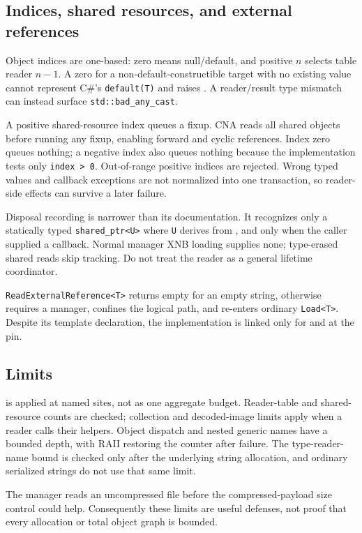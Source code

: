\subsection{Indices, shared resources, and external references}

Object indices are one-based: zero means null/default, and positive $n$ selects table reader
$n-1$. A zero for a non-default-constructible target with no existing value cannot represent
C\#'s \texttt{default(T)} and raises . A reader/result type
mismatch can instead surface \texttt{std::bad\_any\_cast}.

A positive shared-resource index queues a fixup. CNA reads all shared objects before running any
fixup, enabling forward and cyclic references. Index zero queues nothing; a negative index also
queues nothing because the implementation tests only \texttt{index > 0}. Out-of-range positive
indices are rejected. Wrong typed values and callback exceptions are not normalized into one
transaction, so reader-side effects can survive a later failure.

Disposal recording is narrower than its documentation. It recognizes only a statically typed
\texttt{shared\_ptr<U>} where \texttt{U} derives from , and only when the
caller supplied a callback. Normal manager XNB loading supplies none; type-erased shared reads
skip tracking. Do not treat the reader as a general lifetime coordinator.

\texttt{ReadExternalReference<T>} returns empty for an empty string, otherwise requires a manager,
confines the logical path, and re-enters ordinary \texttt{Load<T>}. Despite its template
declaration, the implementation is linked only for  and
 at the pin.

\subsection{Limits}

 is applied at named sites, not as one aggregate budget. Reader-table and
shared-resource counts are checked; collection and decoded-image limits apply when a reader calls
their helpers. Object dispatch and nested generic names have a bounded depth, with RAII restoring
the counter after failure. The type-reader-name bound is checked only after the underlying string
allocation, and ordinary serialized strings do not use that same limit.

The manager reads an uncompressed file before the compressed-payload size control could help.
Consequently these limits are useful defenses, not proof that every allocation or total object
graph is bounded.

